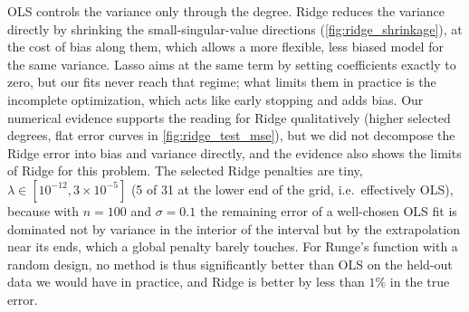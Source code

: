 OLS controls the variance only through the degree. Ridge reduces the variance
directly by shrinking the small-singular-value directions
(\cref{fig:ridge_shrinkage}), at the cost of bias along them, which allows a
more flexible, less biased model for the same variance. Lasso aims at the same
term by setting coefficients exactly to zero, but our fits never reach that
regime; what limits them in practice is the incomplete optimization, which acts
like early stopping and adds bias. Our numerical evidence supports the reading
for Ridge qualitatively (higher selected degrees, flat error curves in
\cref{fig:ridge_test_mse}), but we did not decompose the Ridge error into bias
and variance directly, and the evidence also shows the limits of Ridge for this
problem. The
selected Ridge penalties are tiny, $\lambda \in [10^{-12}, 3\times10^{-5}]$
(5 of 31 at the lower end of the grid, i.e.\ effectively OLS), because with $n
= 100$ and $\sigma=0.1$ the remaining error of a well-chosen OLS fit is
dominated not by variance in the interior of the interval but by the
extrapolation near its ends, which a global penalty barely touches. For Runge's
function with a random design, no method is thus significantly better than OLS
on the held-out data we would have in practice, and Ridge is better by less than
$1\%$ in the true error.
